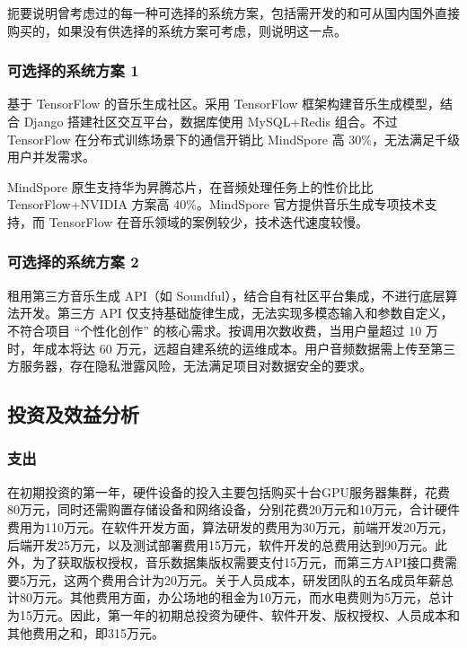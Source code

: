\documentclass{base}
\numberwithin{figure}{section} %
\begin{document}
扼要说明曾考虑过的每一种可选择的系统方案，包括需开发的和可从国内国外直接购买的，如果没有供选择的系统方案可考虑，则说明这一点。

\subsubsection{可选择的系统方案 1}

基于 TensorFlow 的音乐生成社区。采用 TensorFlow 框架构建音乐生成模型，结合 Django 搭建社区交互平台，数据库使用 MySQL+Redis 组合。不过 TensorFlow 在分布式训练场景下的通信开销比 MindSpore 高 30\%，无法满足千级用户并发需求。

MindSpore 原生支持华为昇腾芯片，在音频处理任务上的性价比比 TensorFlow+NVIDIA 方案高 40\%。MindSpore 官方提供音乐生成专项技术支持，而 TensorFlow 在音乐领域的案例较少，技术迭代速度较慢。

\subsubsection{可选择的系统方案 2}

租用第三方音乐生成 API（如 Soundful），结合自有社区平台集成，不进行底层算法开发。第三方 API 仅支持基础旋律生成，无法实现多模态输入和参数自定义，不符合项目 “个性化创作” 的核心需求。按调用次数收费，当用户量超过 10 万时，年成本将达 60 万元，远超自建系统的运维成本。用户音频数据需上传至第三方服务器，存在隐私泄露风险，无法满足项目对数据安全的要求。

\subsection{投资及效益分析}

\subsubsection{支出}

在初期投资的第一年，硬件设备的投入主要包括购买十台GPU服务器集群，花费80万元，同时还需购置存储设备和网络设备，分别花费20万元和10万元，合计硬件费用为110万元。在软件开发方面，算法研发的费用为30万元，前端开发20万元，后端开发25万元，以及测试部署费用15万元，软件开发的总费用达到90万元。此外，为了获取版权授权，音乐数据集版权需要支付15万元，而第三方API接口费需要5万元，这两个费用合计为20万元。关于人员成本，研发团队的五名成员年薪总计80万元。其他费用方面，办公场地的租金为10万元，而水电费则为5万元，总计为15万元。因此，第一年的初期总投资为硬件、软件开发、版权授权、人员成本和其他费用之和，即315万元。
\end{document}
